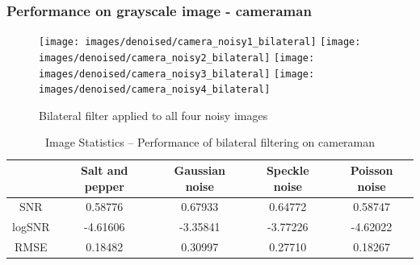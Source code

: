 \documentclass{article}
\begin{document}
\subsubsection{Performance on grayscale image - cameraman}
\begin{figure}[H]
  \centering
  \texttt{[image: images/denoised/camera\_noisy1\_bilateral]}
  \texttt{[image: images/denoised/camera\_noisy2\_bilateral]}
  \texttt{[image: images/denoised/camera\_noisy3\_bilateral]}
  \texttt{[image: images/denoised/camera\_noisy4\_bilateral]}
  \caption{Bilateral filter applied to all four noisy images}
\end{figure}
%
\begin{table}[H]
  \centering
  \begin{tabular}{c | c | c | c | c}
    & Salt and pepper & Gaussian noise & Speckle noise & Poisson noise \\
    \hline
    SNR    & 0.58776  & 0.67933  & 0.64772  & 0.58747  \\
    logSNR & -4.61606 & -3.35841 & -3.77226 & -4.62022 \\
    RMSE   & 0.18482  & 0.30997  & 0.27710  & 0.18267  \\
  \end{tabular}
  \caption{Image Statistics -- Performance of bilateral filtering on cameraman}
  \label{table:}
\end{table}
\newpage
\printbibliography
\end{document}
